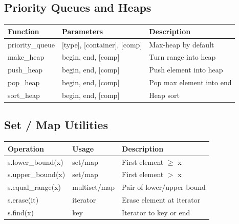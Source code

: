 \documentclass[10pt]{article}
\begin{document}
\begin{multicols*}{2}
\subsection*{Priority Queues and Heaps}
\begin{tabularx}{\linewidth}{|l|l|X|}
    \hline
    \textbf{Function} & \textbf{Parameters} & \textbf{Description} \\
    \hline
    priority\_queue & [type], [container], [comp] & Max-heap by default \\
    \hline
    make\_heap & begin, end, [comp] & Turn range into heap \\
    \hline
    push\_heap & begin, end, [comp] & Push element into heap \\
    \hline
    pop\_heap & begin, end, [comp] & Pop max element into end \\
    \hline
    sort\_heap & begin, end, [comp] & Heap sort \\
    \hline
\end{tabularx}

\subsection*{Set / Map Utilities}
\begin{tabularx}{\linewidth}{|l|l|X|}
    \hline
    \textbf{Operation} & \textbf{Usage} & \textbf{Description} \\
    \hline
    s.lower\_bound(x) & set/map & First element $\geq$ x \\
    \hline
    s.upper\_bound(x) & set/map & First element $>$ x \\
    \hline
    s.equal\_range(x) & multiset/map & Pair of lower/upper bound \\
    \hline
    s.erase(it) & iterator & Erase element at iterator \\
    \hline
    s.find(x) & key & Iterator to key or end \\
    \hline
\end{tabularx}


\end{multicols*}
\end{document}
